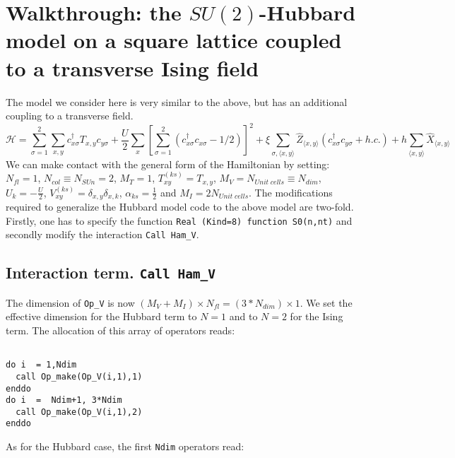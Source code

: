 \section{Walkthrough: the $SU(2)$-Hubbard model on a square lattice coupled to a transverse Ising field}\label{sec:walk2}




The model we consider here  is very similar to the  above,  but has an additional coupling to a transverse field. 
\begin{equation}
\label{eqn_hubbard_sun_Ising}
\mathcal{H}=
\sum\limits_{\sigma=1}^{2} 
\sum\limits_{x,y } 
  c^{\dagger}_{x \sigma} T_{x,y}c^{\phantom\dagger}_{y \sigma} 
+ \frac{U}{2}\sum\limits_{x}\left[
\sum\limits_{\sigma=1}^{2}
\left(  c^{\dagger}_{x \sigma} c^{\phantom\dagger}_{x \sigma}  -1/2 \right) \right]^{2}   
+  \xi \sum_{\sigma,\langle x,y \rangle} \hat{Z}_{\langle x,y \rangle}  \left( c^{\dagger}_{x \sigma} c^{\phantom\dagger}_{y \sigma}  + h.c. \right) + h \sum_{\langle x,y \rangle} \hat{X}_{\langle x,y \rangle}
\end{equation}
We can make contact with the general form of the Hamiltonian by setting: 
$N_{fl} = 1$, $N_{col} \equiv N_{SUn}     =2 $,   $M_T    =    1$,  $T^{(ks)}_{x y}   =  T_{x,y}$,  $M_V   =  N_{Unit\; cells} \equiv N_{dim}$,  $U_{k}       =   -\frac{U}{2}$, 
 $V_{x y}^{(ks)} =  \delta_{x,y} \delta_{x,k}$,  $\alpha_{ks}   =  \frac{1}{2}  $ and $M_I       = 2 N_{Unit\; cells} $.
The modifications  required to generalize the Hubbard model code to the above model are two-fold.  Firstly, one has to specify the function \texttt{Real (Kind=8) function S0(n,nt)} and  secondly  modify the interaction \texttt{Call Ham\_V}.


\subsection{Interaction term. \texttt{Call Ham\_V}}
The dimension of   \texttt{Op\_V}  is now  $(M_V + M_I)\times N_{fl}=(3*N_{dim}) \times 1$. 
We set the effective dimension  for the Hubbard term to  $N=1$  and to  $N=2$ for the Ising term. The allocation of this array of operators reads: 

\begin{lstlisting}

do i  = 1,Ndim
  call Op_make(Op_V(i,1),1)
enddo
do i  =  Ndim+1, 3*Ndim
  call Op_make(Op_V(i,1),2)
enddo

\end{lstlisting}
As for the Hubbard case, the first \texttt{Ndim}  operators read: 

